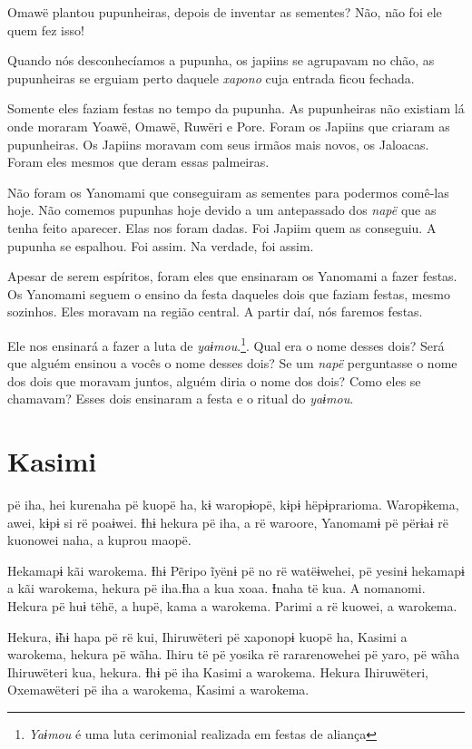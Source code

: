 Omawë plantou pupunheiras, depois de inventar as sementes? Não, não foi
ele quem fez isso!

Quando nós desconhecíamos a pupunha, os japiins se agrupavam no chão, as
pupunheiras se erguiam perto daquele \textit{xapono} cuja entrada ficou fechada. 

Somente eles faziam festas no tempo da pupunha. As pupunheiras não
existiam lá onde moraram Yoawë, Omawë, Ruwëri e Pore. Foram os Japiins
que criaram as pupunheiras. Os Japiins moravam com seus irmãos mais
novos, os Jaloacas. Foram eles mesmos que deram essas palmeiras. 

Não foram os Yanomami que conseguiram as sementes para podermos comê-las
hoje. Não comemos pupunhas hoje devido a um antepassado
dos \textit{napë} que as tenha feito aparecer. Elas nos foram
dadas. Foi Japiim quem as conseguiu. A pupunha se espalhou. Foi
assim. Na verdade, foi assim. 

Apesar de serem espíritos, foram eles que ensinaram os Yanomami a fazer
festas. Os Yanomami seguem o ensino da festa daqueles dois que faziam
festas, mesmo sozinhos. Eles moravam na região central. A partir daí,
nós faremos festas. 

Ele nos ensinará a fazer a luta de \textit{yaɨmou}.\footnote{\textit{Yaɨmou} é uma luta cerimonial realizada em festas de aliança}. Qual era o nome
desses dois? Será que alguém ensinou a vocês o nome desses dois? Se
um \textit{napë} perguntasse o nome dos dois que moravam juntos, alguém
diria o nome dos dois? Como eles se chamavam? Esses dois
ensinaram a festa e o ritual do \textit{yaɨmou}. 

\chapter{Kasimi}
 
 pë iha, hei kurenaha pë kuopë ha, kɨ waropɨopë, kɨpɨ
hëpɨprarioma. Waropɨkema, awei, kɨpɨ si rë poaɨwei. Ɨhɨ hekura pë iha, a
rë waroore, Yanomamɨ pë përɨaɨ rë kuonowei naha, a kuprou maopë. 

Hekamapɨ kãi warokema. Ɨhɨ Pẽripo ĩyënɨ pë no rë watëɨwehei, pë yesinɨ
hekamapɨ a kãi warokema, hekura pë iha.Ɨha a kua xoaa. Ɨnaha të kua. A nomanomi. Hekura pë huɨ tëhë, a hupë, kama a warokema. Parimi a rë
kuowei, a warokema. 

Hekura, ɨ̃hɨ hapa pë rë kui, Ihiruwëteri pë xaponopɨ kuopë ha, Kasimi a
warokema, hekura pë wãha. Ihiru të pë yosika rë rararenowehei pë yaro,
pë wãha Ihiruwëteri kua, hekura. Ɨhɨ pë iha Kasimi a warokema. Hekura
Ihiruwëteri, Oxemawëteri pë iha a warokema, Kasimi a warokema. 

